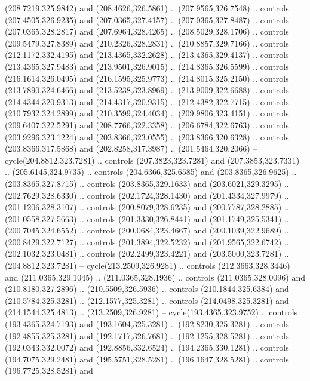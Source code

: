 \begin{scope}[cm={{1.25,0.0,0.0,-1.25,(0.0,743.43331)}}]
    (208.7219,325.9842) and (208.4626,326.5861) .. (207.9565,326.7548) .. controls
    (207.4505,326.9235) and (207.0365,327.4157) .. (207.0365,327.8487) .. controls
    (207.0365,328.2817) and (207.6964,328.4265) .. (208.5029,328.1706) .. controls
    (209.5479,327.8389) and (210.2326,328.2831) .. (210.8857,329.7166) .. controls
    (212.1172,332.4195) and (213.4365,332.2628) .. (213.4365,329.4137) .. controls
    (213.4365,327.9483) and (213.9501,326.9015) .. (214.8365,326.5599) .. controls
    (216.1614,326.0495) and (216.1595,325.9773) .. (214.8015,325.2150) .. controls
    (213.7890,324.6466) and (213.5238,323.8969) .. (213.9009,322.6688) .. controls
    (214.4344,320.9313) and (214.4317,320.9315) .. (212.4382,322.7715) .. controls
    (210.7932,324.2899) and (210.3599,324.4034) .. (209.9806,323.4151) .. controls
    (209.6407,322.5291) and (208.7766,322.3358) .. (206.6784,322.6763) .. controls
    (203.9296,323.1224) and (203.8366,323.0555) .. (203.8366,320.6328) .. controls
    (203.8366,317.5868) and (202.8258,317.3987) .. (201.5464,320.2066) --
    cycle(204.8812,323.7281) .. controls (207.3823,323.7281) and
    (207.3853,323.7331) .. (205.6145,324.9735) .. controls (204.6366,325.6585) and
    (203.8365,326.9625) .. (203.8365,327.8715) .. controls (203.8365,329.1633) and
    (203.6021,329.3295) .. (202.7629,328.6330) .. controls (202.1724,328.1430) and
    (201.4334,327.9979) .. (201.1206,328.3107) .. controls (200.8079,328.6235) and
    (200.7787,328.2885) .. (201.0558,327.5663) .. controls (201.3330,326.8441) and
    (201.1749,325.5341) .. (200.7045,324.6552) .. controls (200.0684,323.4667) and
    (200.1039,322.9689) .. (200.8429,322.7127) .. controls (201.3894,322.5232) and
    (201.9565,322.6742) .. (202.1032,323.0481) .. controls (202.2499,323.4221) and
    (203.5000,323.7281) .. (204.8812,323.7281) -- cycle(213.2509,326.9281) ..
    controls (212.3663,328.3446) and (211.0365,329.1045) .. (211.0365,328.1936) ..
    controls (211.0365,328.0096) and (210.8180,327.2896) .. (210.5509,326.5936) ..
    controls (210.1844,325.6384) and (210.5784,325.3281) .. (212.1577,325.3281) ..
    controls (214.0498,325.3281) and (214.1544,325.4813) .. (213.2509,326.9281) --
    cycle(193.4365,323.9752) .. controls (193.4365,324.7193) and
    (193.1604,325.3281) .. (192.8230,325.3281) .. controls (192.4855,325.3281) and
    (192.1717,326.7681) .. (192.1255,328.5281) .. controls (192.0343,332.0072) and
    (192.8856,332.6524) .. (194.2365,330.1281) .. controls (194.7075,329.2481) and
    (195.5751,328.5281) .. (196.1647,328.5281) .. controls (196.7725,328.5281) and

\end{scope}
